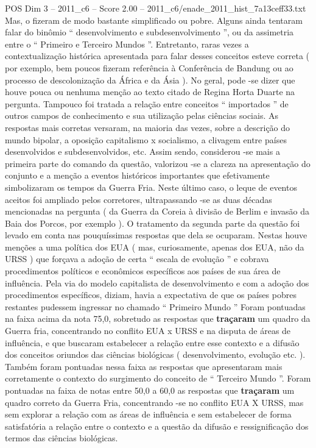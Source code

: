 \begin{textsample}{POS Dim 3 – 2011\_c6 – Score 2.00 – 2011\_c6/enade\_2011\_hist\_7a13ceff33.txt}
Mas, o fizeram de modo bastante simplificado ou pobre.
Alguns ainda tentaram falar do binômio “ desenvolvimento e subdesenvolvimento ”, ou da assimetria entre o “ Primeiro e Terceiro Mundos ”.
Entretanto, raras vezes a contextualização histórica apresentada para falar desses conceitos esteve correta ( por exemplo, bem poucos fizeram referência à Conferência de Bandung ou ao processo de descolonização da África e da Ásia ).
No geral, pode -se dizer que houve pouca ou nenhuma menção ao texto citado de Regina Horta Duarte na pergunta.
Tampouco foi tratada a relação entre conceitos “ importados ” de outros campos de conhecimento e sua utilização pelas ciências sociais.
As respostas mais corretas versaram, na maioria das vezes, sobre a descrição do mundo bipolar, a oposição capitalismo x socialismo, a clivagem entre países desenvolvidos e subdesenvolvidos, etc.
Assim sendo, considerou -se mais a primeira parte do comando da questão, valorizou -se a clareza na apresentação do conjunto e a menção a eventos históricos importantes que efetivamente simbolizaram os tempos da Guerra Fria.
Neste último caso, o leque de eventos aceitos foi ampliado pelos corretores, ultrapassando -se as duas décadas mencionadas na pergunta ( da Guerra da Coreia à divisão de Berlim e invasão da Baia dos Porcos, por exemplo ).
O tratamento da segunda parte da questão foi levado em conta nas pouquíssimas respostas que dela se ocuparam.
Nestas houve menções a uma política dos EUA ( mas, curiosamente, apenas dos EUA, não da URSS ) que forçava a adoção de certa “ escala de evolução ” e cobrava procedimentos políticos e econômicos específicos aos países de sua área de influência.
Pela via do modelo capitalista de desenvolvimento e com a adoção dos procedimentos específicos, diziam, havia a expectativa de que os países pobres restantes pudessem ingressar no chamado “ Primeiro Mundo ” Foram pontuadas na faixa acima da nota 75,0, sobretudo as respostas que \textbf{traçaram} um quadro da Guerra fria, concentrando no conflito EUA x URSS e na disputa de áreas de influência, e que buscaram estabelecer a relação entre esse contexto e a difusão dos conceitos oriundos das ciências biológicas ( desenvolvimento, evolução etc. ).
Também foram pontuadas nessa faixa as respostas que apresentaram mais corretamente o contexto do surgimento do conceito de “ Terceiro Mundo ”.
Foram pontuadas na faixa de notas entre 50,0 a 60,0 as respostas que \textbf{traçaram} um quadro correto da Guerra Fria, concentrando -se no conflito EUA X URSS, mas sem explorar a relação com as áreas de influência e sem estabelecer de forma satisfatória a relação entre o contexto e a questão da difusão e ressignificação dos termos das ciências biológicas.

\end{textsample}
